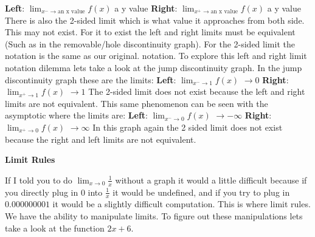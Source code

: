 \documentclass{article}
\begin{document}
\newline
\newline
\textbf{Left}: $\lim_{x^-\to \text{an x value}} f(x)$ a y value 
\newline
\newline
\textbf{Right}: $\lim_{x^+\to \text{an x value}} f(x)$ a y value
\newline
\newline
There is also the 2-sided limit which is what value it approaches from both side. This may not exist. For it to exist the left and right limits must be equivalent (Such as in the removable/hole discontinuity graph). For the 2-sided limit the notation is the same as our original. notation.
\newline
\newline
To explore this left and right limit notation dilemma lets take a look at the jump discontinuity graph. In the jump discontinuity graph these are the limits:
\newline
\newline
\textbf{Left}: $\lim_{x^-\to1} f(x)$ $\to0$
\newline
\newline
\textbf{Right}: $\lim_{x^+\to1} f(x)$ $\to1$
\newline
\newline
The 2-sided limit does not exist because the left and right limits are not equivalent. This same phenomenon can be seen with the asymptotic where the limits are:
\newline
\newline
\textbf{Left}: $\lim_{x^-\to0} f(x)$ $\to-\infty$
\newline
\newline
\textbf{Right}: $\lim_{x^+\to0} f(x)$ $\to\infty$
\newline
\newline
In this graph again the 2 sided limit does not exist because the right and left limits are not equivalent.
\begin{center}
    \textbf{Limit Rules}
\end{center}
If I told you to do $\lim_{x\to0} \frac{1}{x}$ without a graph it would a little difficult because if you directly plug in $0$ into $\frac{1}{x}$ it would be undefined, and if you try to plug in $0.000000001$ it would be a slightly difficult computation. This is where limit rules. We have the ability to manipulate limits. To figure out these manipulations lets take a look at the function $2x+6$.
\newline
\newline
\end{document}
